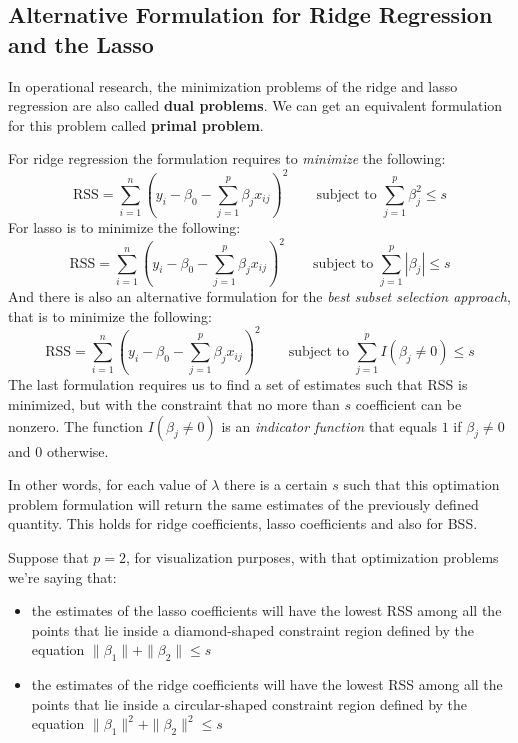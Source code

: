 \subsection*{Alternative Formulation for Ridge Regression and the Lasso}

In operational research, the minimization problems of the ridge and lasso regression are also called \textbf{dual problems}. We can get an equivalent formulation for this problem called \textbf{primal problem}.

For ridge regression the formulation requires to \textit{minimize} the following:
\[
    \text{RSS} = \sum_{i=1}^{n} \left(y_i - \beta_0 - \sum_{j=1}^{p} \beta_j x_{ij}\right)^2 \qquad \text{subject to } \sum_{j=1}^p \beta_j^2 \leq s
\]
For lasso is to minimize the following:
\[
    \text{RSS} = \sum_{i=1}^{n} \left(y_i - \beta_0 - \sum_{j=1}^{p} \beta_j x_{ij}\right)^2 \qquad \text{subject to } \sum_{j=1}^p |\beta_j| \leq s
\]
And there is also an alternative formulation for the \textit{best subset selection approach}, that is to minimize the following:
\[
    \text{RSS} = \sum_{i=1}^{n} \left(y_i - \beta_0 - \sum_{j=1}^{p} \beta_j x_{ij}\right)^2 \qquad \text{subject to } \sum_{j=1}^p I(\beta_j \neq 0) \leq s
\]
The last formulation requires us to find a set of estimates such that RSS is minimized, but with the constraint that no more than $s$ coefficient can be nonzero. The function $I(\beta_j \neq 0)$ is an \textit{indicator function} that equals $1$ if $\beta_j \neq 0$ and $0$ otherwise.

In other words, for each value of $\lambda$ there is a certain $s$ such that this optimation problem formulation will return the same estimates of the previously defined quantity. This holds for ridge coefficients, lasso coefficients and also for BSS.

Suppose that $p=2$, for visualization purposes, with that optimization problems we're saying that:
\begin{itemize}
    \item the estimates of the lasso coefficients will have the lowest RSS among all the points that lie inside a diamond-shaped constraint region defined by the equation $\|\beta_1\| + \|\beta_2\| \leq s$
    \item the estimates of the ridge coefficients will have the lowest RSS among all the points that lie inside a circular-shaped constraint region defined by the equation $\|\beta_1\|^2 + \|\beta_2\|^2 \leq s$
\end{itemize}

